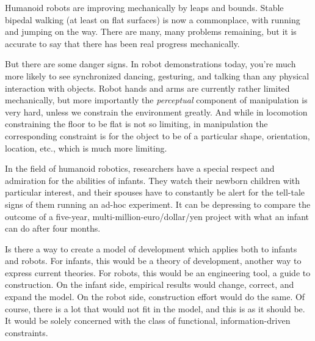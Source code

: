 
Humanoid robots are improving mechanically by leaps and bounds.
Stable bipedal walking (at least on flat surfaces) is now a
commonplace, with running and jumping on the way.  There are
many, many problems remaining, but it is accurate to say that
there has been real progress mechanically.

But there are some danger signs.  In robot demonstrations today,
you're much more likely to see synchronized dancing, gesturing, and
talking than any physical interaction with objects.  Robot hands and
arms are currently rather limited mechanically, but more importantly
the {\em perceptual} component of manipulation is very hard, unless we
constrain the environment greatly.  And while in locomotion
constraining the floor to be flat is not so limiting, in manipulation
the corresponding constraint is for the object to be of a particular
shape, orientation, location, etc., which is much more limiting.

In the field of humanoid robotics, researchers have a special respect
and admiration for the abilities of infants.  They watch their newborn
children with particular interest, and their spouses have to
constantly be alert for the tell-tale signs of them running an ad-hoc
experiment.  It can be depressing to compare the outcome of a 
five-year, multi-million-euro/dollar/yen project with what an
infant can do after four months.


Is there a way to create a model of development which applies both to infants
and robots.  
%
For infants, this would be a theory of development, another way to
express current theories.
%
For robots, this would be an engineering tool, a guide to
construction.
%
On the infant side, empirical results would change, correct, and expand
the model.  On the robot side, construction effort would do the same.
%
%
Of course, there is a lot that would not fit in the model, and this is
as it should be.  It would be solely concerned with the class of 
functional, information-driven constraints.


\nocite{kirkham02visual}
\nocite{johnson05building}
\nocite{diamond05not}




\nocite{bajcsy88active,aloimonos87active,ballard91animate}
\nocite{whaite97autonomous} 
\nocite{barnard02comparison}

